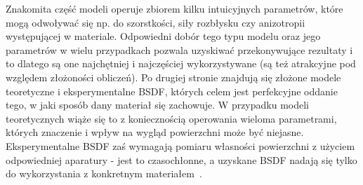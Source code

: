 Znakomita część modeli operuje zbiorem kilku intuicyjnych parametrów, które mogą odwoływać się np. do szorstkości, siły rozbłysku czy anizotropii występującej w materiale. Odpowiedni dobór tego typu modelu oraz jego parametrów w wielu przypadkach pozwala uzyskiwać przekonywujące rezultaty i to dlatego są one najchętniej i najczęściej wykorzystywane (są też atrakcyjne pod względem złożoności obliczeń). Po drugiej stronie znajdują się złożone modele teoretyczne i eksperymentalne BSDF, których celem jest perfekcyjne oddanie tego, w jaki sposób dany materiał się zachowuje. W przypadku modeli teoretycznych wiąże się to z koniecznością operowania wieloma parametrami, których znaczenie i wpływ na wygląd powierzchni może być niejasne. Eksperymentalne BSDF zaś wymagają pomiaru własności powierzchni z użyciem odpowiedniej aparatury - jest to czasochłonne, a uzyskane BSDF nadają się tylko do wykorzystania z konkretnym materiałem~\cite{Montes12anoverview}.

